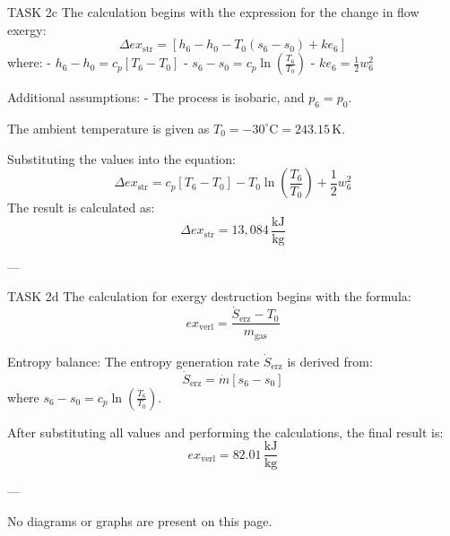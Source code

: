 TASK 2c  
The calculation begins with the expression for the change in flow exergy:  
\[
\Delta ex_{\text{str}} = \left[ h_6 - h_0 - T_0 (s_6 - s_0) + ke_6 \right]
\]  
where:  
- \( h_6 - h_0 = c_p [T_6 - T_0] \)  
- \( s_6 - s_0 = c_p \ln \left( \frac{T_6}{T_0} \right) \)  
- \( ke_6 = \frac{1}{2} w_6^2 \)  

Additional assumptions:  
- The process is isobaric, and \( p_6 = p_0 \).  

The ambient temperature is given as \( T_0 = -30^\circ\text{C} = 243.15 \, \text{K} \).  

Substituting the values into the equation:  
\[
\Delta ex_{\text{str}} = c_p \left[ T_6 - T_0 \right] - T_0 \ln \left( \frac{T_6}{T_0} \right) + \frac{1}{2} w_6^2
\]  
The result is calculated as:  
\[
\Delta ex_{\text{str}} = 13,084 \, \frac{\text{kJ}}{\text{kg}}
\]  

---

TASK 2d  
The calculation for exergy destruction begins with the formula:  
\[
ex_{\text{verl}} = \frac{\dot{S}_{\text{erz}} - T_0}{m_{\text{gas}}}
\]  

Entropy balance:  
The entropy generation rate \( \dot{S}_{\text{erz}} \) is derived from:  
\[
\dot{S}_{\text{erz}} = \dot{m} \left[ s_6 - s_0 \right]
\]  
where \( s_6 - s_0 = c_p \ln \left( \frac{T_6}{T_0} \right) \).  

After substituting all values and performing the calculations, the final result is:  
\[
ex_{\text{verl}} = 82.01 \, \frac{\text{kJ}}{\text{kg}}
\]  

---

No diagrams or graphs are present on this page.